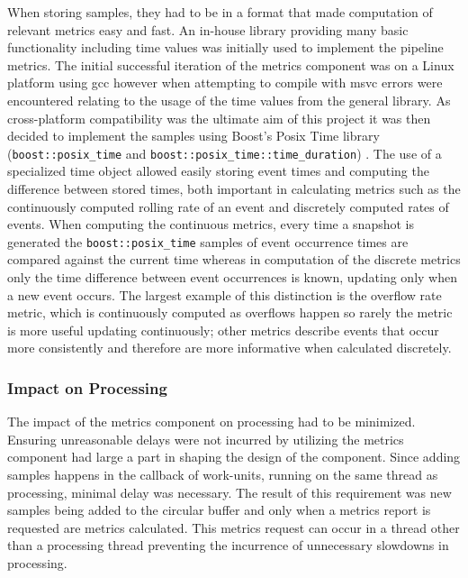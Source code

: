When storing samples, they had to be in a format that made computation of
relevant metrics easy and fast. An in-house library providing many basic
functionality including time values was initially used to implement the \gls{pipeline}
metrics. The initial successful iteration of the metrics component was on a
Linux platform using \gls{gcc} however when attempting to compile with
\gls{msvc} errors were encountered relating to the usage of the time values from
the general library.  As cross-platform compatibility was the ultimate aim of
this project it was then decided to implement the samples using Boost's Posix
Time library (\lstinline|boost::posix_time| and
\lstinline|boost::posix_time::time_duration|) \cite{boost:posixtime}. The use of
a specialized time object allowed easily storing event times and computing the
difference between stored times, both
important in calculating metrics such as the continuously computed rolling rate
of an event and discretely computed rates of events. When computing the
continuous metrics, every time a snapshot is generated the
\lstinline|boost::posix_time| samples of event occurrence times are
compared against the current time whereas in computation of the discrete metrics
only the time difference between event occurrences is known, updating only when
a new event occurs. The largest example of this distinction is the overflow rate
metric, which is continuously computed as overflows happen so rarely the metric
is more useful updating continuously; other metrics describe events that occur
more consistently and therefore are more informative when calculated discretely.

\subsubsection{Impact on Processing}

The impact of the metrics component on processing had to be minimized. Ensuring
unreasonable delays were not incurred by utilizing the metrics component had
large a part in shaping the design of the component. Since adding samples
happens in the callback of \glspl{work-unit}, running on the same thread as
processing, minimal delay was necessary. The result of this requirement was new
samples being added to the circular buffer and only when a metrics report is
requested are metrics calculated. This metrics request can occur in a
\gls{thread} other than a processing thread preventing the incurrence of
unnecessary slowdowns in processing.

